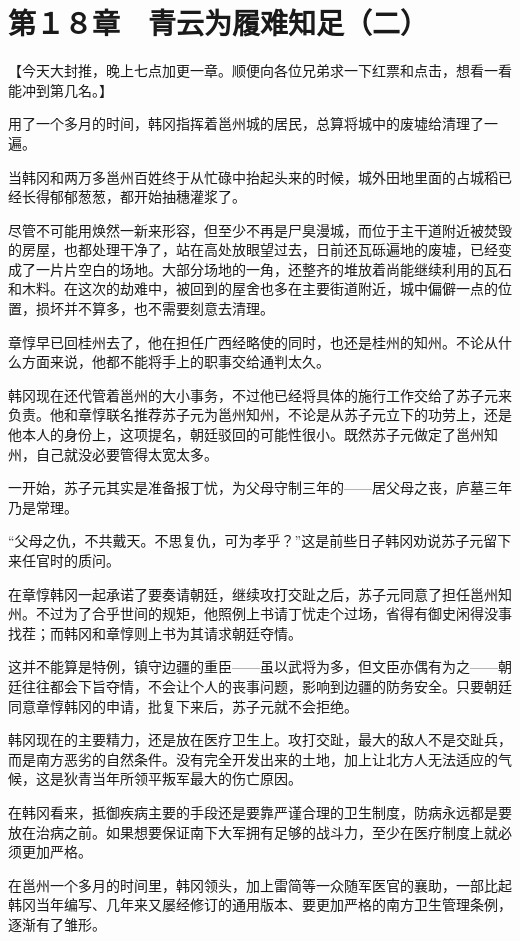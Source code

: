 \section{第１８章　青云为履难知足（二）}

【今天大封推，晚上七点加更一章。顺便向各位兄弟求一下红票和点击，想看一看能冲到第几名。】

用了一个多月的时间，韩冈指挥着邕州城的居民，总算将城中的废墟给清理了一遍。

当韩冈和两万多邕州百姓终于从忙碌中抬起头来的时候，城外田地里面的占城稻已经长得郁郁葱葱，都开始抽穗灌浆了。

尽管不可能用焕然一新来形容，但至少不再是尸臭漫城，而位于主干道附近被焚毁的房屋，也都处理干净了，站在高处放眼望过去，日前还瓦砾遍地的废墟，已经变成了一片片空白的场地。大部分场地的一角，还整齐的堆放着尚能继续利用的瓦石和木料。在这次的劫难中，被回到的屋舍也多在主要街道附近，城中偏僻一点的位置，损坏并不算多，也不需要刻意去清理。

章惇早已回桂州去了，他在担任广西经略使的同时，也还是桂州的知州。不论从什么方面来说，他都不能将手上的职事交给通判太久。

韩冈现在还代管着邕州的大小事务，不过他已经将具体的施行工作交给了苏子元来负责。他和章惇联名推荐苏子元为邕州知州，不论是从苏子元立下的功劳上，还是他本人的身份上，这项提名，朝廷驳回的可能性很小。既然苏子元做定了邕州知州，自己就没必要管得太宽太多。

一开始，苏子元其实是准备报丁忧，为父母守制三年的——居父母之丧，庐墓三年乃是常理。

“父母之仇，不共戴天。不思复仇，可为孝乎？”这是前些日子韩冈劝说苏子元留下来任官时的质问。

在章惇韩冈一起承诺了要奏请朝廷，继续攻打交趾之后，苏子元同意了担任邕州知州。不过为了合乎世间的规矩，他照例上书请丁忧走个过场，省得有御史闲得没事找茬；而韩冈和章惇则上书为其请求朝廷夺情。

这并不能算是特例，镇守边疆的重臣——虽以武将为多，但文臣亦偶有为之——朝廷往往都会下旨夺情，不会让个人的丧事问题，影响到边疆的防务安全。只要朝廷同意章惇韩冈的申请，批复下来后，苏子元就不会拒绝。

韩冈现在的主要精力，还是放在医疗卫生上。攻打交趾，最大的敌人不是交趾兵，而是南方恶劣的自然条件。没有完全开发出来的土地，加上让北方人无法适应的气候，这是狄青当年所领平叛军最大的伤亡原因。

在韩冈看来，抵御疾病主要的手段还是要靠严谨合理的卫生制度，防病永远都是要放在治病之前。如果想要保证南下大军拥有足够的战斗力，至少在医疗制度上就必须更加严格。

在邕州一个多月的时间里，韩冈领头，加上雷简等一众随军医官的襄助，一部比起韩冈当年编写、几年来又屡经修订的通用版本、要更加严格的南方卫生管理条例，逐渐有了雏形。

